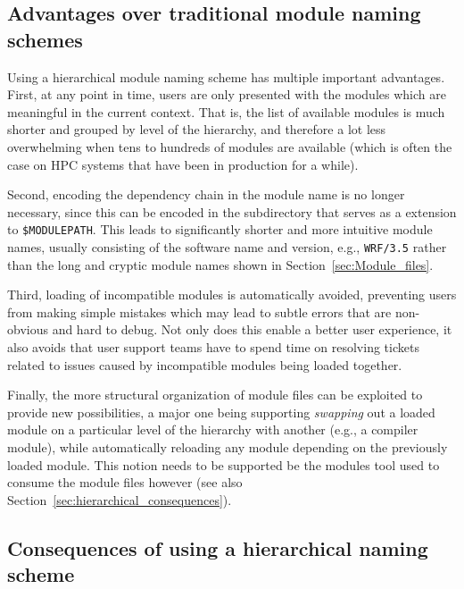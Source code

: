 \label{sec:hierarchical_advantages}
\subsection{Advantages over traditional module naming schemes}


Using a hierarchical module naming scheme has multiple important
advantages. First, at any point in time, users are only presented with the
modules which are meaningful in the current context. That is, the list of
available modules is much shorter and grouped by level of the hierarchy,
and therefore a lot less overwhelming when tens to hundreds of modules are
available (which is often the case on HPC systems that have been in
production for a while).

Second, encoding the dependency chain in the module name is no longer
necessary, since this can be encoded in the subdirectory that serves as a
extension to
\texttt{\$MODULEPATH}. This leads to significantly shorter and more intuitive
module names, usually consisting of the software name and version, e.g.,
\texttt{WRF/3.5} rather than the long and cryptic module names shown in
Section~\ref{sec:Module_files}.

Third, loading of incompatible
modules is automatically avoided, preventing users from making simple
mistakes which may lead to subtle errors that are non-obvious and hard to
debug. Not only does this enable a better user experience, it also avoids
that user support teams have to spend time on resolving tickets related
to issues caused by incompatible modules being loaded together.

Finally, the more structural organization of module files can be exploited
to provide new possibilities, a major one being supporting \emph{swapping}
out a loaded module on a particular level of the hierarchy with another
(e.g., a compiler module), while automatically reloading any module depending
on the previously loaded module. This notion needs to be supported be the
modules tool used to consume the module files however (see also
Section~\ref{sec:hierarchical_consequences}).


\label{sec:hierarchical_consequences}
\subsection{Consequences of using a hierarchical naming scheme}


